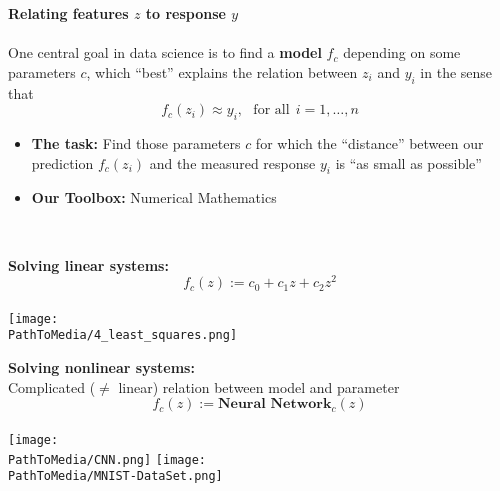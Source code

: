 \begin{frame}
\textbf{\large \color{header} Relating features $z$ to response $y$}~\\~\\
One central goal in data science is to find a \textbf{model} $f_c$ depending on some parameters $c$, which ``best'' explains the relation between $z_i$ and $y_i$ in the sense that 
$$f_c(z_i) \approx y_i,~~~\text{for all}~~i=1,\ldots,n$$
\begin{itemize}
	\item  \textbf{The task:} Find those parameters $c$ for which the ``distance'' between our prediction  $f_c(z_i)$ and the measured response $y_i$ is ``as small as possible''\\
	\item \textbf{Our Toolbox:} Numerical Mathematics
	~\\
\end{itemize}
~\\
\begin{minipage}[t]{0.4\textwidth}
\textbf{\color{header}Solving linear systems:}\\ 
 $$f_c(z) := c_0 + c_1z + c_2 z^2$$\\ \centering
\texttt{[image: \\PathToMedia/4\_least\_squares.png]}\\
\end{minipage}
%
\begin{minipage}[t]{0.6\textwidth}
\textbf{\color{header}Solving nonlinear systems:}\\
Complicated ($\neq$ linear) relation between model and parameter\\
 $$f_c(z) := \textbf{Neural Network}_c(z)$$\\
\texttt{[image: \\PathToMedia/CNN.png]}
\texttt{[image: \\PathToMedia/MNIST-DataSet.png]}
\end{minipage}
\end{frame}





